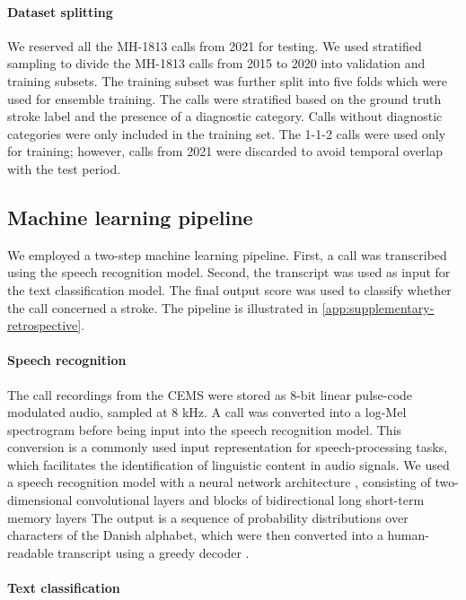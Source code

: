 {\paragraph{Dataset splitting}

We reserved all the MH-1813 calls from 2021 for testing. We used stratified sampling to divide the MH-1813 calls from 2015 to 2020 into validation and training subsets. The training subset was further split into five folds which were used for ensemble training. The calls were stratified based on the ground truth stroke label and the presence of a diagnostic category. Calls without diagnostic categories were only included in the training set. The 1-1-2 calls were used only for training; however, calls from 2021 were discarded to avoid temporal overlap with the test period.


\subsection{Machine learning pipeline}

We employed a two-step machine learning pipeline. First, a call was transcribed using the speech recognition model. Second, the transcript was used as input for the text classification model. The final output score was used to classify whether the call concerned a stroke. The pipeline is illustrated in \cref{app:supplementary-retrospective}.


\paragraph{Speech recognition}

The call recordings from the CEMS were stored as 8-bit linear pulse-code modulated audio, sampled at 8 kHz. A call was converted into a log-Mel spectrogram before being input into the speech recognition model. This conversion is a commonly used input representation for speech-processing tasks, which facilitates the identification of linguistic content in audio signals. We used a speech recognition model with a neural network architecture \cite{borgholt_endtoend_2020}, consisting of two-dimensional convolutional layers \cite{cite22} and blocks of bidirectional long short-term memory layers \cite{hochreiter_long_1997} The output is a sequence of probability distributions over characters of the Danish alphabet, which were then converted into a human-readable transcript using a greedy decoder \cite{graves_connectionist_2006}.


\paragraph{Text classification}

}

